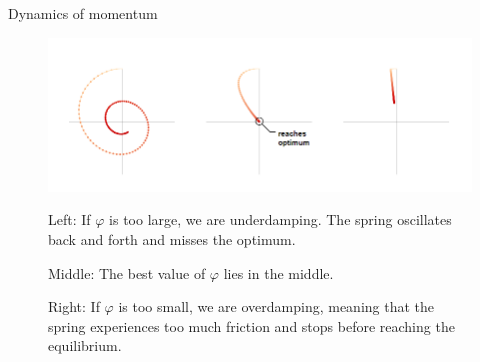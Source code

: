 \documentclass[11pt,compress,t,notes=noshow, xcolor=table]{beamer}
\begin{document}
\begin{vbframe}{Dynamics of momentum}
\framebreak

\begin{figure}
	\includegraphics[height=0.35\textwidth, keepaspectratio]{figure_man/momentum_damping.png} 
	\begin{footnotesize}
		 
		Left: If $\varphi$ is too large, we are underdamping. The spring oscillates back and forth and misses the optimum. 
		
		Middle: The best value of $\varphi$ lies in the middle. 
		
		Right: If $\varphi$ is too small, we are overdamping, meaning that the spring experiences too much friction and stops before reaching the equilibrium. 
	\end{footnotesize}
\end{figure}

\end{vbframe}


\endlecture
\end{document}
